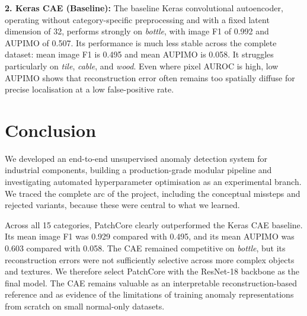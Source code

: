 \documentclass[11pt, a4paper]{article}
\begin{document}
\textbf{2. Keras CAE (Baseline):}
The baseline Keras convolutional autoencoder, operating without category-specific preprocessing and with a fixed latent dimension of 32, performs strongly on \textit{bottle}, with image F1 of 0.992 and AUPIMO of 0.507. Its performance is much less stable across the complete dataset: mean image F1 is 0.495 and mean AUPIMO is 0.058. It struggles particularly on \textit{tile}, \textit{cable}, and \textit{wood}. Even where pixel AUROC is high, low AUPIMO shows that reconstruction error often remains too spatially diffuse for precise localisation at a low false-positive rate.


\section{Conclusion}

We developed an end-to-end unsupervised anomaly detection system for industrial components, building a production-grade modular pipeline and investigating automated hyperparameter optimisation as an experimental branch. We traced the complete arc of the project, including the conceptual missteps and rejected variants, because these were central to what we learned.

Across all 15 categories, PatchCore clearly outperformed the Keras CAE baseline. Its mean image F1 was 0.929 compared with 0.495, and its mean AUPIMO was 0.603 compared with 0.058. The CAE remained competitive on \textit{bottle}, but its reconstruction errors were not sufficiently selective across more complex objects and textures. We therefore select PatchCore with the ResNet-18 backbone as the final model. The CAE remains valuable as an interpretable reconstruction-based reference and as evidence of the limitations of training anomaly representations from scratch on small normal-only datasets.
\end{document}

